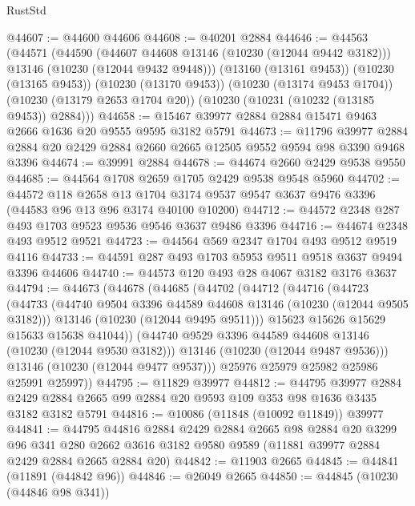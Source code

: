 \begin{lexlean}{RustStd}
\begin{coremodule}
@44607 := @44600 @44606
@44608 := @40201 @2884
@44646 := @44563
    (@44571
      (@44590
        (@44607 @44608 @13146 (@10230 (@12044 @9442 @3182)))
        @13146
        (@10230 (@12044 @9432 @9448)))
      (@13160 (@13161 @9453))
      (@10230 (@13165 @9453))
      (@10230 (@13170 @9453))
      (@10230 (@13174 @9453 @1704))
      (@10230 (@13179 @2653 @1704 @20))
      (@10230 (@10231 (@10232 (@13185 @9453)) @2884)))
@44658 := @15467 @39977 @2884 @2884 @15471 @9463 @2666 @1636 @20 @9555 @9595 @3182 @5791
@44673 := @11796
    @39977
    @2884
    @2884
    @20
    @2429
    @2884
    @2660
    @2665
    @12505
    @9552
    @9594
    @98
    @3390
    @9468
    @3396
@44674 := @39991 @2884
@44678 := @44674 @2660 @2429 @9538 @9550
@44685 := @44564 @1708 @2659 @1705 @2429 @9538 @9548 @5960
@44702 := @44572
    @118
    @2658
    @13
    @1704
    @3174
    @9537
    @9547
    @3637
    @9476
    @3396
    (@44583 @96 @13 @96 @3174 @40100 @10200)
@44712 := @44572 @2348 @287 @493 @1703 @9523 @9536 @9546 @3637 @9486 @3396
@44716 := @44674 @2348 @493 @9512 @9521
@44723 := @44564 @569 @2347 @1704 @493 @9512 @9519 @4116
@44733 := @44591 @287 @493 @1703 @5953 @9511 @9518 @3637 @9494 @3396 @44606
@44740 := @44573 @120 @493 @28 @4067 @3182 @3176 @3637
@44794 := @44673
    (@44678
      (@44685
        (@44702
          (@44712
            (@44716
              (@44723
                (@44733
                  (@44740 @9504 @3396 @44589 @44608 @13146 (@10230 (@12044 @9505 @3182)))
                  @13146
                  (@10230 (@12044 @9495 @9511)))
                @15623
                @15626
                @15629
                @15633
                @15638
                @41044))
            (@44740 @9529 @3396 @44589 @44608 @13146 (@10230 (@12044 @9530 @3182)))
            @13146
            (@10230 (@12044 @9487 @9536)))
          @13146
          (@10230 (@12044 @9477 @9537)))
        @25976
        @25979
        @25982
        @25986
        @25991
        @25997))
@44795 := @11829 @39977
@44812 := @44795
    @39977
    @2884
    @2429
    @2884
    @2665
    @99
    @2884
    @20
    @9593
    @109
    @353
    @98
    @1636
    @3435
    @3182
    @3182
    @5791
@44816 := @10086 (@11848 (@10092 @11849)) @39977
@44841 := @44795
    @44816
    @2884
    @2429
    @2884
    @2665
    @98
    @2884
    @20
    @3299
    @96
    @341
    @280
    @2662
    @3616
    @3182
    @9580
    @9589
    (@11881 @39977 @2884 @2429 @2884 @2665 @2884 @20)
@44842 := @11903 @2665
@44845 := @44841 (@11891 (@44842 @96))
@44846 := @26049 @2665
@44850 := @44845 (@10230 (@44846 @98 @341))

\end{coremodule}
\end{lexlean}
